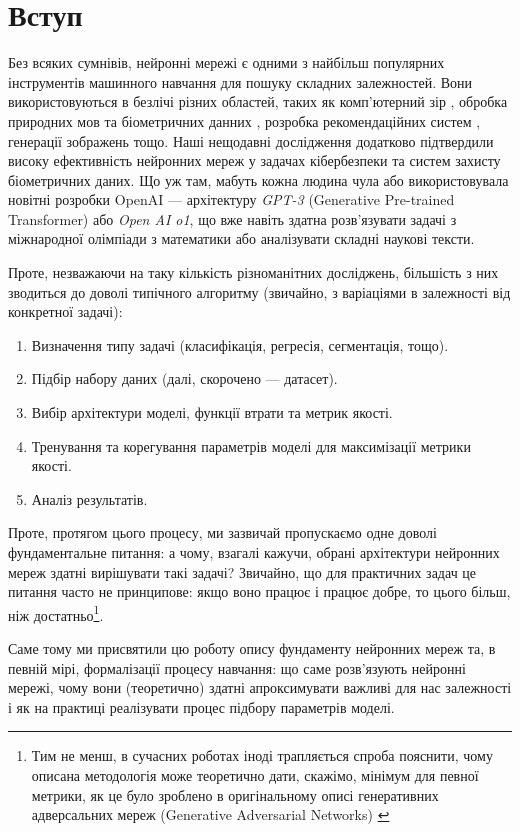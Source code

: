 \chapter*{Вступ}

Без всяких сумнівів, нейронні мережі є одними з найбільш популярних інструментів
машинного навчання для пошуку складних залежностей. Вони використовуються в
безлічі різних областей, таких як комп'ютерний зір \cite{cv-survey}, обробка
природних мов \cite{nlp-survey} та біометричних данних \cite{biometrics-survey},
розробка рекомендаційних систем \cite{recommendation-systems-survey}, генерації
зображень \cite{gan-survey} тощо. Наші нещодавні дослідження
\cite{our-biometrics-1,our-biometrics-2,our-biometrics-3} додатково підтвердили
високу ефективність нейронних мереж у задачах кібербезпеки та систем захисту
біометричних даних. Що уж там, мабуть кожна людина чула або використовувала
новітні розробки OpenAI --- архітектуру \textit{GPT-3} (Generative Pre-trained
Transformer) \cite{chatgpt} або \textit{Open AI o1}, що вже навіть здатна
розв'язувати задачі з міжнародної олімпіади з математики або аналізувати складні
наукові тексти. 

Проте, незважаючи на таку кількість різноманітних досліджень, більшість з них 
зводиться до доволі типічного алгоритму (звичайно, з варіаціями в залежності від
конкретної задачі):
\begin{enumerate}
    \item Визначення типу задачі (класифікація, регресія, сегментація, тощо).
    \item Підбір набору даних (далі, скорочено --- датасет).
    \item Вибір архітектури моделі, функції втрати та метрик якості.
    \item Тренування та корегування параметрів моделі для максимізації метрики якості.
    \item Аналіз результатів.
\end{enumerate}

Проте, протягом цього процесу, ми зазвичай пропускаємо одне доволі
фундаментальне питання: а чому, взагалі кажучи, обрані архітектури нейронних
мереж здатні вирішувати такі задачі? Звичайно, що для практичних задач це
питання часто не принципове: якщо воно працює і працює добре, то цього більш,
ніж достатньо\footnote{Тим не менш, в сучасних роботах іноді трапляється спроба
пояснити, чому описана методологія може теоретично дати, скажімо, мінімум для
певної метрики, як це було зроблено в оригінальному описі генеративних
адверсальних мереж (Generative Adversarial Networks) \cite{gan}}.

Саме тому ми присвятили цю роботу опису фундаменту нейронних
мереж та, в певній мірі, формалізації процесу навчання: що саме 
розв'язують нейронні мережі, чому вони (теоретично) здатні
апроксимувати важливі для нас залежності і як на практиці
реалізувати процес підбору параметрів моделі.

